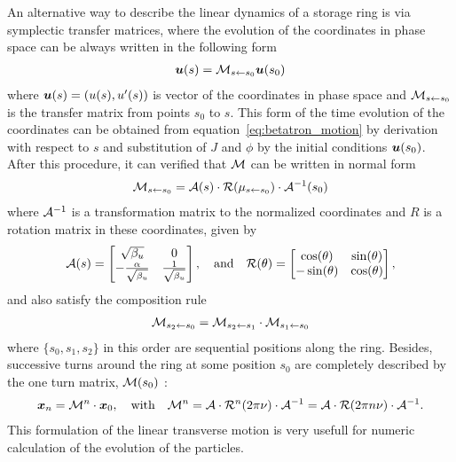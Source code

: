 	An alternative way to describe the linear dynamics of a storage ring is via symplectic transfer matrices, where the evolution of the coordinates in phase space can be always written in the following form
	\begin{align}
		\boldsymbol{u}(s) = \mathcal{M}_{s\gets s_0} \boldsymbol{u}(s_0)
	\end{align}
	where $\boldsymbol{u}(s) = \left(u(s), u'(s)\right)$ is vector of the coordinates in phase space and $\mathcal{M}_{s\gets s_0}$ is the transfer matrix from points $s_0$ to $s$. This form of the time evolution of the coordinates can be obtained from equation~\eqref{eq:betatron_motion} by derivation with respect to $s$ and substitution of $J$ and $\phi$ by the initial conditions $\boldsymbol{u}(s_0)$. After this procedure, it can verified that $\mathcal{M}$ can be written in normal form~\cite{Bengtsson1997}
	\begin{align}
		\mathcal{M}_{s\gets s_0} = \mathcal{A}(s)\cdot\mathcal{R}(\mu_{s\gets s_0})\cdot\mathcal{A}^{-1}(s_0)
	\end{align}
	where $\mathcal{A}^{-1}$ is a transformation matrix to the normalized coordinates and $R$ is a rotation matrix in these coordinates, given by
	\begin{align}
        \mathcal{A}(s) =
                \begin{bmatrix}
                    \sqrt{\beta_u}                 & 0\\
                    -\frac{\alpha}{\sqrt{\beta_u}} & \frac{1}{\sqrt{\beta_u}}
                \end{bmatrix},
				\quad\text{and}\quad
        \mathcal{R}(\theta) =
				\begin{bmatrix}
					\cos(\theta)  & \sin(\theta)\\
					-\sin(\theta) & \cos(\theta)
				\end{bmatrix},
	\end{align}
	and also satisfy the composition rule
	\begin{align}
		\mathcal{M}_{s_2\gets s_0} = \mathcal{M}_{s_2\gets s_1}\cdot\mathcal{M}_{s_1\gets s_0}
	\end{align}
	where $\{s_0, s_1, s_2\}$ in this order are sequential positions along the ring. Besides, successive turns around the ring at some position $s_0$ are completely described by the one turn matrix, $\mathcal{M}(s_0)$ :
	\begin{align}
		\boldsymbol{x}_n = \mathcal{M}^n \cdot \boldsymbol{x}_0, \quad \text{with} \quad
		\mathcal{M}^n = \mathcal{A}\cdot\mathcal{R}^n(2\pi\nu)\cdot\mathcal{A}^{-1} =
					    \mathcal{A}\cdot\mathcal{R}(2\pi n \nu)\cdot\mathcal{A}^{-1}.
	\end{align}
    This formulation of the linear transverse motion is very usefull for numeric calculation of the evolution of the particles.

